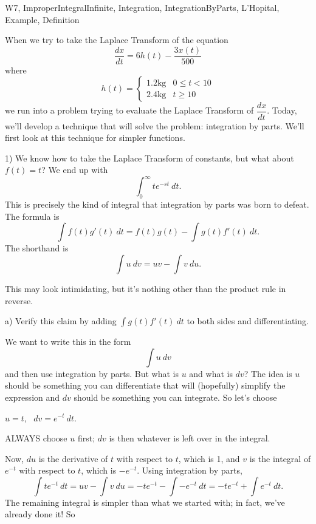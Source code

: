 \begin{tagblock}{W7, ImproperIntegralInfinite, Integration, IntegrationByParts, L'Hopital, Example, Definition}
\begin{question}
	
When we try to take the Laplace Transform of the equation
\begin{equation}\label{brine}
\frac{dx}{dt}=6h(t)-\frac{3x(t)}{500}
\end{equation}
where 
\[
h(t)=\begin{cases} 1.2\textrm{kg} & 0\leq t<10 \\ 2.4\textrm{kg} & t\geq 10 \end{cases}
\]
we run into a problem trying to evaluate the Laplace Transform of $\dfrac{dx}{dt}$. Today, we'll develop a technique that will solve the problem: integration by parts. We'll first look at this technique for simpler functions. 

\bigskip

1) We know how to take the Laplace Transform of constants, but what about $f(t)=t$? We end up with
\[
\int_0^{\infty} te^{-st} \ dt.
\]
This is precisely the kind of integral that integration by parts was born to defeat. The formula is
\begin{equation}\label{parts}
\int f(t)g'(t) \ dt=f(t)g(t)-\int g(t)f'(t) \ dt.
\end{equation}
The shorthand is
\[
\int u \ dv=uv-\int v \ du.
\]

This may look intimidating, but it's nothing other than the product rule in reverse. 

\bigskip

a) Verify this claim by adding $\displaystyle\int g(t)f'(t) \ dt$ to both sides and differentiating.

\newpage

We want to write this in the form
\[
\int u \ dv
\]
and then use integration by parts. But what is $u$ and what is $dv$? The idea is $u$ should be something you can differentiate that will (hopefully) simplify the expression and $dv$ should be something you can integrate. So let's choose
\begin{center}
$u=t$, \ $dv=e^{-t} \ dt$. 
\end{center}
ALWAYS choose $u$ first; $dv$ is then whatever is left over in the integral. 

Now, $du$ is the derivative of $t$ with respect to $t$, which is 1, and $v$ is the integral of $e^{-t}$ with respect to $t$, which is $-e^{-t}$. Using integration by parts,
\[
\int te^{-t} \ dt=uv-\int v \ du=-te^{-t}-\int -e^{-t} \ dt=-te^{-t}+\int e^{-t} \ dt.
\]
The remaining integral is simpler than what we started with; in fact, we've already done it! So


\end{question}
\end{tagblock}
